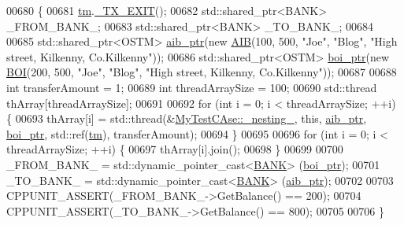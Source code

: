 \begin{DoxyCode}
00680                                                     \{
00681     \hyperlink{class_my_test_c_ase_a422e6e5d4ddedea384be96031c89b72b_a422e6e5d4ddedea384be96031c89b72b}{tm}.\hyperlink{class_t_m_a5e2d1127f2429f2f524d25f430eade06_a5e2d1127f2429f2f524d25f430eade06}{\_TX\_EXIT}();
00682     std::shared\_ptr<BANK> \_FROM\_BANK\_;
00683     std::shared\_ptr<BANK> \_TO\_BANK\_;
00684     
00685     std::shared\_ptr<OSTM> \hyperlink{class_my_test_c_ase_adad50e8278b64aa0321000b528e5362c_adad50e8278b64aa0321000b528e5362c}{aib\_ptr}(\textcolor{keyword}{new} \hyperlink{class_a_i_b}{AIB}(100, 500, \textcolor{stringliteral}{"Joe"}, \textcolor{stringliteral}{"Blog"}, \textcolor{stringliteral}{"High street, Kilkenny,
       Co.Kilkenny"}));
00686     std::shared\_ptr<OSTM> \hyperlink{class_my_test_c_ase_a5554de9e3e6393a89c66c036c529720b_a5554de9e3e6393a89c66c036c529720b}{boi\_ptr}(\textcolor{keyword}{new} \hyperlink{class_b_o_i}{BOI}(200, 500, \textcolor{stringliteral}{"Joe"}, \textcolor{stringliteral}{"Blog"}, \textcolor{stringliteral}{"High street, Kilkenny,
       Co.Kilkenny"}));
00687     
00688     \textcolor{keywordtype}{int} transferAmount = 1;
00689     \textcolor{keywordtype}{int} threadArraySize = 100; 
00690     std::thread thArray[threadArraySize];
00691 
00692     \textcolor{keywordflow}{for} (\textcolor{keywordtype}{int} i = 0; i < threadArraySize; ++i) \{
00693         thArray[i] = std::thread(&\hyperlink{class_my_test_c_ase_abb973a1396c1083891d76845e2cfaf64_abb973a1396c1083891d76845e2cfaf64}{MyTestCAse::\_nesting\_}, \textcolor{keyword}{this}, 
      \hyperlink{class_my_test_c_ase_adad50e8278b64aa0321000b528e5362c_adad50e8278b64aa0321000b528e5362c}{aib\_ptr}, \hyperlink{class_my_test_c_ase_a5554de9e3e6393a89c66c036c529720b_a5554de9e3e6393a89c66c036c529720b}{boi\_ptr}, std::ref(\hyperlink{class_my_test_c_ase_a422e6e5d4ddedea384be96031c89b72b_a422e6e5d4ddedea384be96031c89b72b}{tm}), transferAmount);
00694     \}
00695     
00696     \textcolor{keywordflow}{for} (\textcolor{keywordtype}{int} i = 0; i < threadArraySize; ++i) \{
00697         thArray[i].join();
00698     \}
00699     
00700     \_FROM\_BANK\_ = std::dynamic\_pointer\_cast<\hyperlink{class_b_a_n_k}{BANK}> (\hyperlink{class_my_test_c_ase_a5554de9e3e6393a89c66c036c529720b_a5554de9e3e6393a89c66c036c529720b}{boi\_ptr});
00701     \_TO\_BANK\_ = std::dynamic\_pointer\_cast<\hyperlink{class_b_a_n_k}{BANK}> (\hyperlink{class_my_test_c_ase_adad50e8278b64aa0321000b528e5362c_adad50e8278b64aa0321000b528e5362c}{aib\_ptr});
00702     
00703     CPPUNIT\_ASSERT(\_FROM\_BANK\_->GetBalance() == 200);
00704     CPPUNIT\_ASSERT(\_TO\_BANK\_->GetBalance() == 800);
00705     
00706 \}
\end{DoxyCode}


